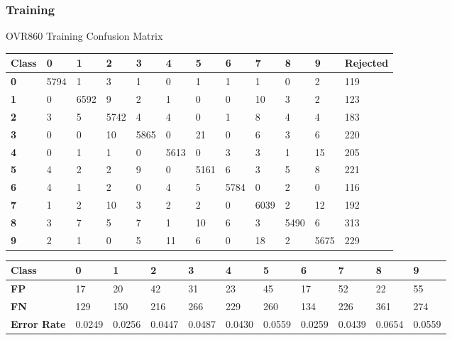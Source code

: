 \documentclass[
  a4paper,            %
  DIV=10,             %
  oneside,            %
  BCOR=5mm,           %
  parskip=half,       %
  numbers=noenddot,   %
  bibtotoc,           %
  listof=totoc,        %
  article
]{scrreprt}
\begin{document}
\subsubsection{Training}
\begin{center}
  \small{OVR860 Training Confusion Matrix}
  \begin{tabular}{|p{1cm}|p{1cm}|p{1cm}|p{1cm}|p{1cm}|p{1cm}|p{1cm}|p{1cm}|p{1cm}|p{1cm}|p{1cm}|p{1.7cm}|}
    \hline
    \textbf{Class} & \textbf{0} & \textbf{1} & \textbf{2} & \textbf{3} & \textbf{4} & \textbf{5} & \textbf{6} & \textbf{7} & \textbf{8} & \textbf{9} & \textbf{Rejected} \\
    \hline
    \textbf{0} & 5794 & 1 & 3 & 1 & 0 & 1 & 1 & 1 & 0 & 2 & 119 \\
    \hline
    \textbf{1} & 0 & 6592 & 9 & 2 & 1 & 0 & 0 & 10 & 3 & 2 & 123 \\
    \hline
    \textbf{2} & 3 & 5 & 5742 & 4 & 4 & 0 & 1 & 8 & 4 & 4 & 183 \\
    \hline
    \textbf{3} & 0 & 0 & 10 & 5865 & 0 & 21 & 0 & 6 & 3 & 6 & 220 \\
    \hline
    \textbf{4} & 0 & 1 & 1 & 0 & 5613 & 0 & 3 & 3 & 1 & 15 & 205 \\
    \hline
    \textbf{5} & 4 & 2 & 2 & 9 & 0 & 5161 & 6 & 3 & 5 & 8 & 221 \\
    \hline
    \textbf{6} & 4 & 1 & 2 & 0 & 4 & 5 & 5784 & 0 & 2 & 0 & 116 \\
    \hline
    \textbf{7} & 1 & 2 & 10 & 3 & 2 & 2 & 0 & 6039 & 2 & 12 & 192 \\
    \hline
    \textbf{8} & 3 & 7 & 5 & 7 & 1 & 10 & 6 & 3 & 5490 & 6 & 313 \\
    \hline
    \textbf{9} & 2 & 1 & 0 & 5 & 11 & 6 & 0 & 18 & 2 & 5675 & 229 \\
    \hline
  \end{tabular}
\end{center}

\begin{center}
  \begin{tabular}{|p{1cm}|p{1cm}|p{1cm}|p{1cm}|p{1cm}|p{1cm}|p{1cm}|p{1cm}|p{1cm}|p{1cm}|p{1cm}|}
    \hline
    \textbf{Class} & \textbf{0} & \textbf{1} & \textbf{2} & \textbf{3} & \textbf{4} & \textbf{5} & \textbf{6} & \textbf{7} & \textbf{8} & \textbf{9} \\
    \hline
    \textbf{FP} & 17 & 20 & 42 & 31 & 23 & 45 & 17 & 52 & 22 & 55 \\
    \hline
    \textbf{FN} & 129 & 150 & 216 & 266 & 229 & 260 & 134 & 226 & 361 & 274 \\
    \hline
    \textbf{Error Rate} & 0.0249 & 0.0256 & 0.0447 & 0.0487 & 0.0430 & 0.0559 & 0.0259 & 0.0439 & 0.0654 & 0.0559 \\
    \hline
  \end{tabular}
\end{center}
\end{document}
